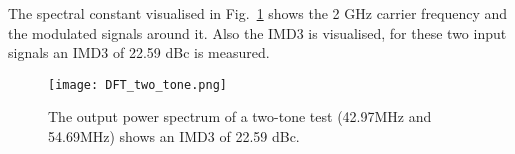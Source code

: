 The spectral constant visualised in Fig.~\ref{fig:DFT_two_tone} shows the 2 GHz carrier frequency and the modulated signals around it. Also the IMD3 is visualised, for these two input signals an IMD3 of 22.59 dBc is measured.
\begin{figure}[h] 
\texttt{[image: DFT\_two\_tone.png]}
\caption{The output power spectrum of a two-tone test (42.97MHz and 54.69MHz) shows an IMD3 of 22.59 dBc.}
\label{fig:DFT_two_tone}
\end{figure}

